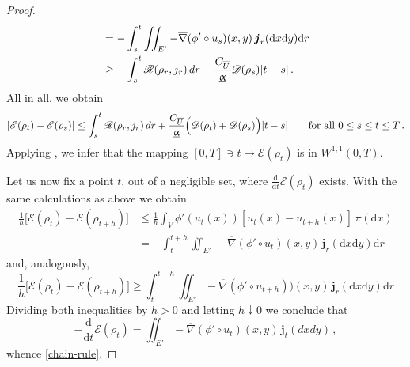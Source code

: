 \documentclass[11pt,reqno]{amsart}
\numberwithin{equation}{section}
\newcommand{\calD}{\mathcal{D}}
\newcommand{\calR}{\mathcal{R}}
\newcommand{\dnabla}{\overline\nabla}
\newcommand{\dd}{\mathrm{d}}
\theoremstyle{definition}
\def\dd{\mathrm{d}}
\newcommand{\Fish}{\mathscr{D}}
\newcommand{\teta}{\boldsymbol \vartheta}
\newcommand{\tetapi}{\boldsymbol{\teta}_{\kappa}}
\def\calS{\mathscr E}
\def\calR{\mathscr R}
\newcommand{\scrR}{\mathscr{R}}
\newcommand{\jj}{{\boldsymbol{j}}}
\newcommand{\Ed}{{E'}}
\newcommand{\down}{\downarrow}
\newcommand{\RBS}{\color{black}} %
\numberwithin{equation}{section}
\begin{document}
\begin{proof}
\begin{align*}
        &  = - \int_s^t \iint_{\RBS E'} {-}\dnabla (\phi'\circ u_s)(x,y)\,\jj_r(\dd x \dd y) \dd r
        \\
        & \geq - \int_s^t \scrR(\rho_r,j_r)\,dr -  \frac{C_{\overline{U}}}{ \underline{\upalpha}}   \Fish(\rho_s)|t-s|\,.
\end{align*}
All in all, we obtain
\[
    |\calS(\rho_t) - \calS(\rho_s)| \le \int_s^t \scrR(\rho_r,j_r)\,dr + \frac{C_{\overline{U}}}{ \underline{\upalpha}}\Bigl( \Fish(\rho_t)+ \Fish(\rho_s)\Bigr)|t-s| \qquad \text{for all } 0 \leq s \leq t \leq T\,.
\]
Applying \cite[Lemma 1.2.6]{AGS08}, we infer that the mapping 
$[0,T]\ni t \mapsto \calS(\rho_t)$ is in $W^{1,1}(0,T)$. 
\par
Let us  now fix a point $t$, out of a negligible set, where $\frac{\dd}{\dd t}  \calS(\rho_t)$ exists.
With the same calculations as above 
we obtain
\begin{align*}
    \frac{1}{h}\bigl[\calS(\rho_t) - \calS(\rho_{t+h})\bigr] &  \leq \frac1h \int_V \phi'(u_t(x)) [u_t(x)-u_{t+h}(x)]\,\pi(\dd x) 
    \\
    &
    = -  \int_{t}^{t+h} \iint_{E'} {-}\dnabla (\phi'\circ u_t)(x,y)\,\jj_r(\dd x \dd y) \dd r 
    \end{align*}
    and, analogously,
    \[
     \frac{1}{h}\bigl[\calS(\rho_t) - \calS(\rho_{t+h})\bigr] \geq   \int_{t}^{t+h} \iint_{E'} {-}\dnabla (\phi'\circ u_{t+h}))(x,y)\,\jj_r(\dd x \dd y) \dd r 
    \]
    Dividing both inequalities by $h>0$ and letting $h\down0$ we conclude that 
    \[
   -  \frac{\dd}{\dd t} \calS(\rho_t) =
     \iint_{\Ed} {-}\dnabla (\phi'\circ u_t)(x,y)\, \jj_t(dxdy)\,,
\] 
   whence \eqref{chain-rule}.
%    
%    
%
\end{proof}
\end{document}
